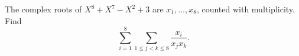 The complex roots of $X^8+X^7-X^2+3$ are $x_1,\ldots,x_8$, counted with multiplicity. Find
\[\sum_{i=1}^8\sum_{1\le j<k\le8}\dfrac{x_i}{x_jx_k}.\]
